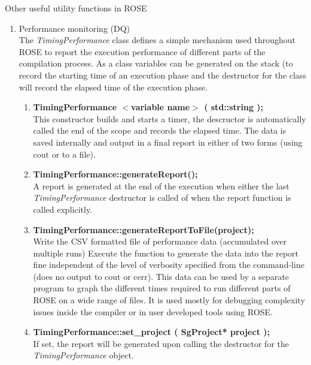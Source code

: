 Other useful utility functions in ROSE 
\begin{enumerate}
   \item Performance monitoring (DQ) \\
   The {\em TimingPerformance} class defines a simple mechanism used throughout ROSE to
   report the execution performance of different parts of the compilation process.
   As a class variables can be generated on the stack (to record the starting time of
   an execution phase and the destructor for the class will record the elapsed time
   of the execution phase.  
   \begin{enumerate}
      \item {\bf TimingPerformance $<$variable name$>$ ( std::string );} \\
      This constructor builds and starts a timer, the descructor is automatically called
      the end of the scope and records the elapsed time.  The data is saved internally and
      output in a final report in either of two forms (using cout or to a file).

      \item {\bf TimingPerformance::generateReport();} \\
      A report is generated at the end of the execution when
      either the last  {\em TimingPerformance} destructor is called of when the 
      report function is called explicitly.

      \item {\bf TimingPerformance::generateReportToFile(project);} \\
      Write the CSV formatted file of performance data (accumulated over multiple runs)
      Execute the function to generate the data into the report fine independent of the 
      level of verbosity specified from the command-line (does no output to cout or cerr).
      This data can be used by a separate program to graph the different times required
      to run different parts of ROSE on a wide range of files.  It is used mostly for
      debugging complexity issues inside the compiler or in user developed tools using 
      ROSE.

      \item {\bf TimingPerformance::set\_project ( SgProject* project );} \\
      If set, the report will be generated upon calling the destructor for
      the {\em TimingPerformance} object. 

   \end{enumerate}


\end{enumerate}
